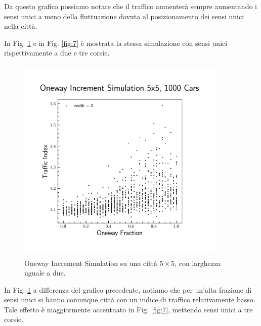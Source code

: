 \documentclass[main.tex]{subfiles}
\begin{document}
        Da questo grafico possiamo notare che il traffico aumenterà sempre aumentando i sensi unici a meno della fluttuazione dovuta
        al posizionamento dei sensi unici nella città.

        In Fig. \ref{fig:6} e in Fig. \ref{fig:7} è mostrata la stessa simulazione con sensi unici rispettivamente a due e tre corsie.

        \begin{figure}[H]
            \centering
            \includegraphics[width=10cm, height=10cm]{oneway_increment_2.png}  
            \caption{Oneway Increment Simulation su una città $5 \times 5$, con larghezza uguale a due.}
            \label{fig:6}
        \end{figure}

        In Fig. \ref{fig:6} a differenza del grafico precedente, notiamo che per un'alta frazione di sensi unici si hanno comunque città
        con un indice di traffico relativamente basso.
        Tale effetto è maggiormente accentuato in Fig. \ref{fig:7}, mettendo sensi unici a tre corsie.
\end{document}
